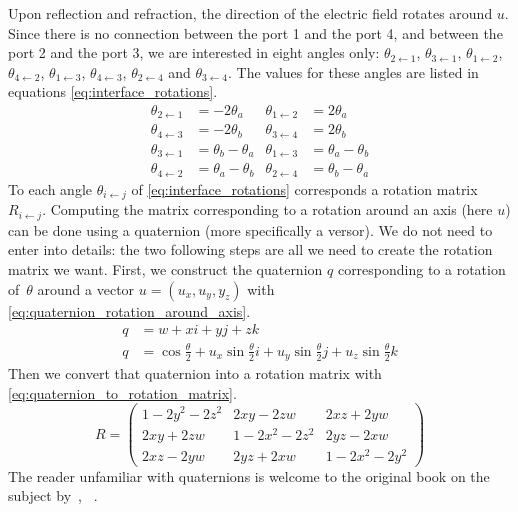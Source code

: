 Upon reflection and refraction, the direction of the electric field rotates around $u$.
Since there is no connection between the port 1 and the port 4, and between the port 2 and the port 3, we are interested in eight angles only:
$\theta_{2 \leftarrow 1}$, $\theta_{3 \leftarrow 1}$,
$\theta_{1 \leftarrow 2}$, $\theta_{4 \leftarrow 2}$,
$\theta_{1 \leftarrow 3}$, $\theta_{4 \leftarrow 3}$,
$\theta_{2 \leftarrow 4}$ and $\theta_{3 \leftarrow 4}$.
The values for these angles are listed in equations \cref{eq:interface_rotations}.
\begin{equation}
    \begin{aligned}
        \theta_{2 \leftarrow 1} &= -2\theta_a
        &
        \theta_{1 \leftarrow 2} &= 2\theta_a
        \\
        \theta_{4 \leftarrow 3} &= -2\theta_b
        &
        \theta_{3 \leftarrow 4} &= 2\theta_b
        \\
        \theta_{3 \leftarrow 1} &= \theta_b - \theta_a
        &
        \theta_{1 \leftarrow 3} &= \theta_a - \theta_b
        \\
        \theta_{4 \leftarrow 2} &= \theta_a - \theta_b
        &
        \theta_{2 \leftarrow 4} &= \theta_b - \theta_a
    \end{aligned}
    \label{eq:interface_rotations}
\end{equation}
To each angle $\theta_{i \leftarrow j}$ of \cref{eq:interface_rotations} corresponds a rotation matrix $R_{i \leftarrow j}$.
Computing the matrix corresponding to a rotation around an axis (here $u$) can be done using a quaternion (more specifically a versor).
We do not need to enter into details: the two following steps are all we need to create the rotation matrix we want.
First, we construct the quaternion $q$ corresponding to a rotation of~$\theta$ around a vector $u=(u_x, u_y, y_z)$ with
\cref{eq:quaternion_rotation_around_axis}.
\begin{equation}
    \begin{aligned}
        q &= w + xi + yj + zk
        \\
        q &= \cos \frac{\theta}{2}
           + u_x \sin \frac{\theta}{2} i
           + u_y \sin \frac{\theta}{2} j
           + u_z \sin \frac{\theta}{2} k
    \end{aligned}
    \label{eq:quaternion_rotation_around_axis}
\end{equation}
Then we convert that quaternion into a rotation matrix with \cref{eq:quaternion_to_rotation_matrix}.
\begin{equation}
    R =
    \begin{pmatrix}
        1 - 2y^2 - 2z^2   &   2xy - 2zw         &   2xz + 2yw \\
        2xy + 2zw         &   1 - 2x^2 - 2z^2   &   2yz - 2xw \\
        2xz - 2yw         &   2yz + 2xw         &   1 - 2x^2 - 2y^2
    \end{pmatrix}
    \label{eq:quaternion_to_rotation_matrix}
\end{equation}
The reader unfamiliar with quaternions is welcome to the original book on the subject by~\citeauthor{hamilton1866elements}, ~\cite{hamilton1866elements}.

